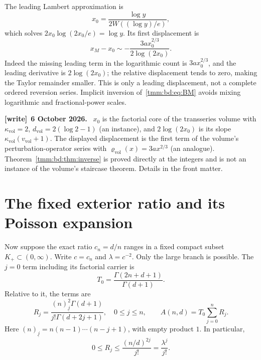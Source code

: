 \documentclass[11pt,letterpaper]{article}
\theoremstyle{remark}\newtheorem{remark}[theorem]{Remark}
\newcommand{\fall}[2]{(#1)_{\underline{#2}}}
\newenvironment{writenote}[1][]{\par\smallskip\begingroup\small
 \noindent\textbf{[write]}\if\relax\detokenize{#1}\relax\else~\textbf{#1.}\fi\ }%
 {\par\endgroup\smallskip}
\newcommand{\vol}{\mathrm{vol}}
\begin{document}
The leading Lambert approximation is
\[
 x_0=\frac{\log y}{2W((\log y)/e)},
\]
which solves $2x_0\log(2x_0/e)=\log y$. Its first displacement is
\[
 x_M-x_0\sim-\frac{3ax_0^{2/3}}{2\log(2x_0)}.
\]
Indeed the missing leading term in the logarithmic count is $3ax_0^{2/3}$, and the leading derivative is $2\log(2x_0)$; the relative displacement tends to zero, making the Taylor remainder smaller. This is only a leading displacement, not a complete ordered reversion series. Implicit inversion of~\eqref{tmm:bd:eq:BM} avoids mixing logarithmic and fractional-power scales.
\begin{writenote}[6 October 2026]
$x_0$ is the factorial core of the transseries volume \cite{TSvol} with $\kappa_\vol=2$, $d_\vol=2(\log2-1)$ (an instance), and $2\log(2x_0)$ is its slope $\kappa_\vol(v_\vol+1)$. The displayed displacement is the first term of the volume's perturbation-operator series with $\varrho_\vol(x)=3ax^{2/3}$ (an analogue). Theorem~\ref{tmm:bd:thm:inverse} is proved directly at the integers and is not an instance of the volume's staircase theorem. Details in the front matter.
\end{writenote}

\section{The fixed exterior ratio and its Poisson expansion}\label{tmm:bd:sec:exterior}
Now suppose the exact ratio $c_n=d/n$ ranges in a fixed compact subset $K_+\subset(0,\infty)$. Write $c=c_n$ and $\lambda=c^{-2}$. Only the large branch is possible. The $j=0$ term including its factorial carrier is
\[
 T_0=\frac{\Gamma(2n+d+1)}{\Gamma(d+1)}.
\]
Relative to it, the terms are
\begin{equation}\label{tmm:bd:eq:exteriorR}
 R_j=\frac{\fall nj^2\Gamma(d+1)}{j!\Gamma(d+2j+1)},\quad0\le j\le n,
 \qquad A(n,d)=T_0\sum_{j=0}^nR_j.
\end{equation}
Here $\fall nj=n(n-1)\cdots(n-j+1)$, with empty product $1$. In particular,
\begin{equation}\label{tmm:bd:eq:exteriordom}
 0\le R_j\le\frac{(n/d)^{2j}}{j!}=\frac{\lambda^j}{j!}.
\end{equation}
\end{document}
